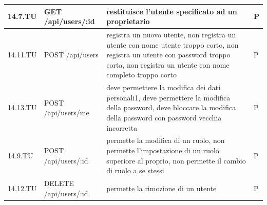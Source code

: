 \documentclass[12pt,a4paper]{article}
\begin{document}
\begin{center}
\begin{longtable}[]{p{} p{} p{} p{}}
			14.7.TU &  GET /api/users/:id & restituisce l'utente specificato ad un proprietario & P \\ \midrule
			14.11.TU &  POST /api/users & registra un nuovo utente, non registra un utente con nome utente troppo corto, non registra un utente con password troppo corta, non registra un utente con nome completo troppo corto & P \\ \midrule
			14.13.TU &  POST /api/users/me & deve permettere la modifica dei dati personali1, deve permettere la modifica della password, deve bloccare la modifica della password con password vecchia incorretta & P \\ \midrule
			14.9.TU &  POST /api/users/:id & permette la modifica di un ruolo, non permette l'impostazione di un ruolo superiore al proprio, non permette il cambio di ruolo a se stessi & P \\ \midrule
			14.12.TU &  DELETE /api/users/:id & permette la rimozione di un utente & P \\ \midrule
	\end{longtable}
	\end{center}	
	
\end{document}
